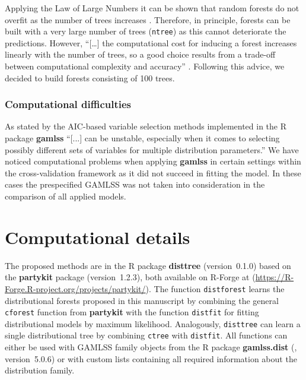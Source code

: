 \documentclass[aoas, preprint]{imsart}
\numberwithin{equation}{subsection}
\begin{document}
Applying the Law of Large Numbers it can be shown that random forests do not overfit 
as the number of trees increases
\citep{Breiman:2001,Hastie+Tibshirani+Friedman:2001,Biau+Scornet:2016}.
Therefore, in principle, forests can be built with a very large number of trees
(\texttt{ntree}) as this cannot deteriorate the predictions. However, ``[\dots] the
computational cost for inducing a forest increases linearly with the number of trees,
so a good choice results from a trade-off between computational complexity and accuracy''
\citep[][p.~205]{Biau+Scornet:2016}.
Following this advice, we decided to build forests consisting of 100 trees.


\subsubsection*{Computational difficulties}
As stated by \cite{Hofner+Mayr+Schmid:2016} the AIC-based variable selection 
methods implemented in the \textsf{R} package \textbf{gamlss} ``[...] can be 
unstable, especially when it comes to selecting possibly different sets of variables for 
multiple distribution parameters.'' We have noticed computational problems when
applying \textbf{gamlss} in certain settings within the cross-validation
framework as it did not succeed in fitting the model. In these cases the prespecified
GAMLSS was not taken into consideration in the comparison of all applied models.


\section*{Computational details}

The proposed methods are in the \textsf{R} package \textbf{disttree}
(version~0.1.0) based on the \textbf{partykit}
package (version~1.2.3), both available 
on \textsf{R}-Forge at
(\url{https://R-Forge.R-project.org/projects/partykit/}). 
The function \texttt{distforest} learns the distributional forests proposed
in this manuscript by combining the general \texttt{cforest} function from
\textbf{partykit} with the function \texttt{distfit} for fitting distributional
models by maximum likelihood. Analogously, \texttt{disttree} can learn a single
distributional tree by combining \texttt{ctree} with \texttt{distfit}.
All functions can either be used with GAMLSS family objects from the \textsf{R} package \textbf{gamlss.dist} 
(\citealp{Stasinopoulos+Rigby:2007}, version~5.0.6)
or with custom lists containing all required information about the distribution family.
\end{document}
